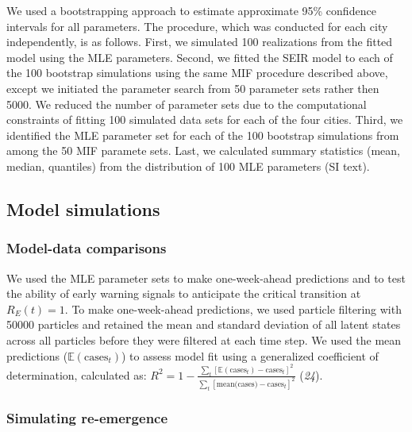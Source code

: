 \documentclass[3p]{elsarticle} %
\begin{document}
We used a bootstrapping approach to estimate approximate 95\% confidence
intervals for all parameters. The procedure, which was conducted for
each city independently, is as follows. First, we simulated 100
realizations from the fitted model using the MLE parameters. Second, we
fitted the SEIR model to each of the 100 bootstrap simulations using the
same MIF procedure described above, except we initiated the parameter
search from 50 parameter sets rather then 5000. We reduced the number of
parameter sets due to the computational constraints of fitting 100
simulated data sets for each of the four cities. Third, we identified
the MLE parameter set for each of the 100 bootstrap simulations from
among the 50 MIF paramete sets. Last, we calculated summary statistics
(mean, median, quantiles) from the distribution of 100 MLE parameters
(SI text).

\hypertarget{model-simulations}{%
\subsection{Model simulations}\label{model-simulations}}

\hypertarget{model-data-comparisons}{%
\subsubsection{Model-data comparisons}\label{model-data-comparisons}}

We used the MLE parameter sets to make one-week-ahead predictions and to
test the ability of early warning signals to anticipate the critical
transition at \(R_E(t) = 1\). To make one-week-ahead predictions, we
used particle filtering with 50000 particles and retained the mean and
standard deviation of all latent states across all particles before they
were filtered at each time step. We used the mean predictions
(\(\mathbb{E}(\text{cases}_t)\)) to assess model fit using a generalized
coefficient of determination, calculated as:
\(R^2 = 1 - \frac{\sum_t [\mathbb{E}(\text{cases}_t) - \text{cases}_t]^2}{\sum_t [\text{mean(cases)}-\text{cases}_t]^2}\)
(\emph{24}).

\hypertarget{simulating-re-emergence}{%
\subsubsection{Simulating re-emergence}\label{simulating-re-emergence}}
\end{document}
